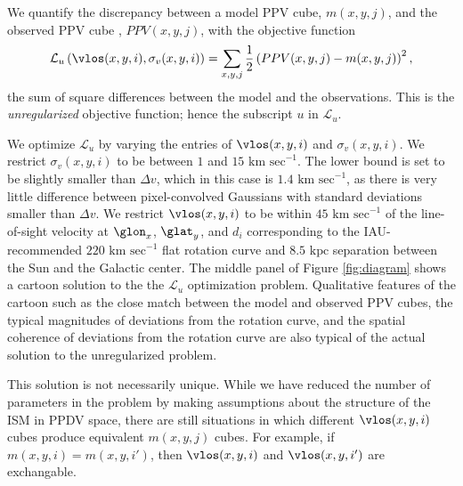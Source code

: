 We quantify the discrepancy between a model PPV cube, $m(x, y, j)$, and the observed PPV cube , $PPV(x, y, j)$, with the objective function
\begin{equation}
  \label{eqn:obj_unreg}
  \mathcal{L}_u \left(\vlos(x, y, i), \sigma_v(x, y, i) \right) = 
  \sum_{x, y, j} \frac{1}{2} \left(PPV(x, y, j) -  m(x, y, j)\right)^2,
\end{equation}
the sum of square differences between the model and the observations. 
This is the \emph{unregularized} objective function; hence the subscript $u$ in $\mathcal{L}_u$.

We optimize $\mathcal{L}_u$ by varying the entries of $\vlos(x, y, i)$ and $\sigma_v(x, y, i)$. 
We restrict $\sigma_v(x, y, i)$ to be between $1$ and $15\text{ km sec}^{-1}$. 
The lower bound is set to be slightly smaller than $\Delta v$, which in this case is $1.4 \text{ km sec}^{-1}$, as there is very little difference between pixel-convolved Gaussians with standard deviations smaller than $\Delta v$. 
We restrict $\vlos(x, y, i)$ to be within $45 \text{ km sec}^{-1}$ of the line-of-sight velocity at $\glon_x$, $\glat_y$, and $d_i$ corresponding to the IAU-recommended $220 \text{ km sec}^{-1}$ flat rotation curve and $8.5 \text{ kpc}$ separation between the Sun and the Galactic center.
The middle panel of Figure \ref{fig:diagram} shows a cartoon solution to the the $\mathcal{L}_u$ optimization problem. 
Qualitative features of the cartoon such as the close match between the model and observed PPV cubes, the typical magnitudes of deviations from the rotation curve, and the spatial coherence of deviations from the rotation curve are also typical of the actual solution to the unregularized problem.

This solution is not necessarily unique. 
While we have reduced the number of parameters in the problem by making assumptions about the structure of the ISM in PPDV space, there are still situations in which different $\vlos(x, y, i)$ cubes produce equivalent $m(x, y, j)$ cubes. 
For example, if $m(x, y, i) = m(x, y, i')$, then $\vlos(x, y, i)$ and $\vlos(x, y, i')$ are exchangable.


